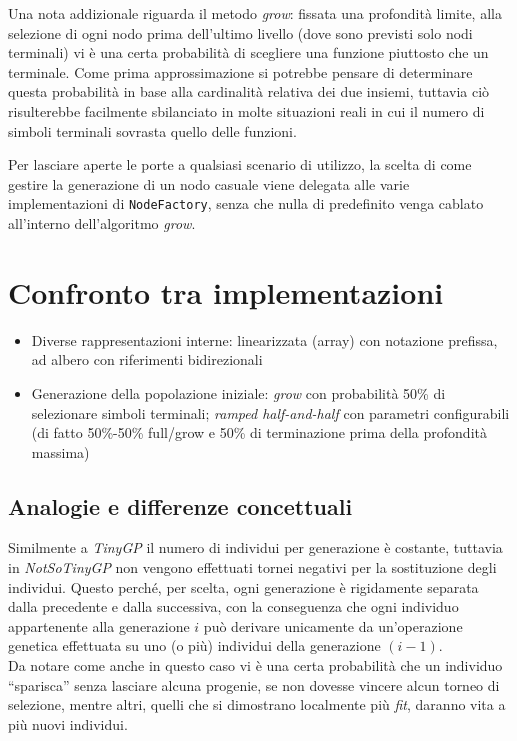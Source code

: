 \documentclass{../llncs}
\begin{document}
Una nota addizionale riguarda il metodo \emph{grow}: fissata una profondità limite, alla selezione di ogni nodo prima dell'ultimo livello (dove sono previsti solo nodi terminali) vi è una certa probabilità di scegliere una funzione piuttosto che un terminale. Come prima approssimazione si potrebbe pensare di determinare questa probabilità in base alla cardinalità relativa dei due insiemi, tuttavia ciò risulterebbe facilmente sbilanciato in molte situazioni reali in cui il numero di simboli terminali sovrasta quello delle funzioni.

Per lasciare aperte le porte a qualsiasi scenario di utilizzo, la scelta di come gestire la generazione di un nodo casuale viene delegata alle varie implementazioni di \texttt{NodeFactory}, senza che nulla di predefinito venga cablato all'interno dell'algoritmo \emph{grow}.

\section{Confronto tra implementazioni}
\begin{itemize}
\item Diverse rappresentazioni interne: linearizzata (array) con notazione prefissa, ad albero con riferimenti bidirezionali
\item Generazione della popolazione iniziale: \emph{grow} con probabilità 50\% di selezionare simboli terminali; \emph{ramped half-and-half} con parametri configurabili (di fatto 50\%-50\% full/grow e 50\% di terminazione prima della profondità massima)
\end{itemize}

\subsection{Analogie e differenze concettuali}
Similmente a \emph{TinyGP} il numero di individui per generazione è costante, tuttavia in \emph{NotSoTinyGP} non vengono effettuati tornei negativi per la sostituzione degli individui. Questo perché, per scelta, ogni generazione è rigidamente separata dalla precedente e dalla successiva, con la conseguenza che ogni individuo appartenente alla generazione $i$ può derivare unicamente da un'operazione genetica effettuata su uno (o più) individui della generazione $(i-1)$.\\

Da notare come anche in questo caso vi è una certa probabilità che un individuo ``sparisca'' senza lasciare alcuna progenie, se non dovesse vincere alcun torneo di selezione, mentre altri, quelli che si dimostrano localmente più \emph{fit}, daranno vita a più nuovi individui.
\end{document}
